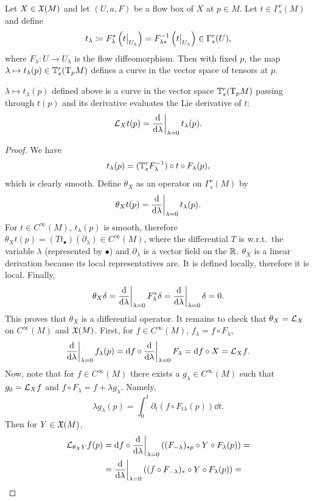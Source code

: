 Let $X\in \mathfrak{X}(M)$ and let $(U,a,F)$ be a flow box of $X$ at $p\in M$. Let $t\in\Gamma^r_s(M)$ and define
\[t_\lambda\coloneqq F_{\lambda}^\ast \left(\restr{t}{U_\lambda}\right)=F_{\lambda\ast}^{-1} \left(\restr{t}{U_\lambda}\right)\in\Gamma^r_s(U),\]
where $F_\lambda :U\to U_\lambda$ is the flow diffeomorphism. Then with fixed $p$, the map $\lambda\mapsto t_\lambda (p) \in \mathbb{T}^r_s (\mathrm{T}_p M)$ defines a curve in the vector space of tensors at $p$.
\begin{thm}
    $\lambda\mapsto t_\lambda (p)$ defined above is a curve in the vector space $\mathbb{T}^r_s (\mathrm{T}_p M)$ passing through $t(p)$ and its derivative evaluates the Lie derivative of $t$:
    \[\Lie_X t(p)=\restr{\frac{\dd}{\dd \lambda}}{\lambda=0}t_\lambda(p).\]
\end{thm}
\begin{proof}
    We have 
    \[t_\lambda(p)=(\mathbb{T}^r_s F_\lambda^{-1})\circ t \circ F_\lambda(p),\] 
    which is clearly smooth.
    Define $\theta_X$ as an operator on $\Gamma^r_s(M)$ by 
    \[\theta_X t(p)=\restr{\frac{\dd}{\dd \lambda}}{\lambda=0} t_\lambda(p).\]
    For $t\in C^\infty(M)$, $t_\lambda(p)$ is smooth, therefore $\theta_X t(p)=(Tt_\bullet)(\partial_\lambda)\in C^\infty(M)$, where the differential $T$ is w.r.t.\ the variable $\lambda$ (represented by $\bullet$) and  $\partial_\lambda$ is a vector field on the $\mathbb{R} $. $\theta_X$ is a linear derivation because its local representatives are. It is defined locally, therefore it is local. Finally, 
    \[\theta_X\delta=\restr{\frac{\dd}{\dd \lambda}}{\lambda=0} F^\ast_\lambda \delta=\restr{\frac{\dd}{\dd \lambda}}{\lambda=0}\delta=0.\] 
    This proves that $\theta_X$ is a differential operator. It remains to check that $\theta_X=\mathcal{L}_X$ on $C^\infty(M)$ and $\mathfrak{X}(M)$. First, for $f\in C^\infty(M)$, 
    $f_\lambda=f\circ F_\lambda$, 
    \[\restr{\frac{\dd}{\dd \lambda}}{\lambda=0}f_\lambda(p)=\dd f\circ \restr{\frac{\dd}{\dd \lambda}}{\lambda=0}F_\lambda=\dd f\circ X=\Lie_X f.\]
    Now, note that for $f\in C^\infty(M)$ there exists a $g_\lambda\in C^\infty(M)$ such that $g_0=\mathcal{L}_X f$ and $f\circ F_\lambda=f+\lambda g_\lambda$. Namely, 
    \[\lambda g_\lambda (p)=\int_0^1 \partial_t(f\circ F_{t\lambda}(p))\dd t.\] 
    Then for $Y\in\mathfrak{X}(M)$,
    \begin{align}
        \Lie_{\theta_X Y}f(p)&=\dd f\circ \restr{\frac{\dd}{\dd \lambda}}{\lambda=0} \left((F_{-\lambda})_{\ast p}\circ Y\circ F_\lambda(p)\right)=\\
        &=\restr{\frac{\dd}{\dd \lambda}}{\lambda=0}\left((f\circ F_{-\lambda})_\ast\circ Y\circ F_\lambda(p)\right)=\\

\end{align}
\end{proof}
